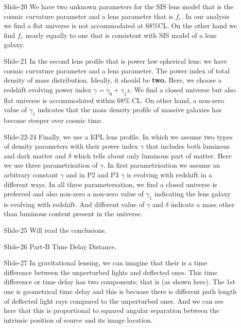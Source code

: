 \documentclass[12pt]{report}
\begin{document}
\begin{itemize}
\item[\ding{74} Slide-20]
We have two unknown parameters for the SIS lens model that is the cosmic curvature parameter and a lens parameter that is $f_e$. In our analysis we find a flat universe is not accommodated at $68\%$CL. On the other hand we find $f_e$ nearly equally to one that is consistent with SIS model of a lens galaxy. 

\item[\ding{74} Slide-21]
In the second lens profile that is power law spherical lens: we have cosmic curvature parameter and a lens parameter. The power index of total density of mass distribution. Ideally, it should be \textbf{two.} Here, we choose a redshift evolving power index $\gamma=\gamma_0+\gamma_1z$. We find a closed universe but also flat universe is accommodated within $68\%$ CL. On other hand, a non-zero value of $\gamma_1$ indicates that the mass density profile of massive galaxies has become steeper over cosmic time.

\item[\ding{74} {\footnotesize Slide-22-24}]
Finally, we use a EPL lens profile. In which we assume two types of density parameters with their power index $\gamma$ that includes both luminous and dark matter and $\delta$ which tells about only luminous part of matter. Here we use three parametrisation of $\gamma$. In first parametrisation we assume an arbitrary constant $\gamma$ and in P2 and P3 $\gamma$ is evolving with redshift in a different ways. In all three parametersation, we find a closed universe is preferred and also non-zero a non-zero value of $\gamma_1$ indicating the lens galaxy is evolving with redshift. And different value of $\gamma$ and $\delta$ indicate a mass other than luminous content present in the universe.

\item[\ding{74} Slide-25] 
Will read the conclusions.

\item[\ding{74} Slide-26]
\hspace{5cm}  Part-B Time Delay Distance.

\item[\ding{74} Slide-27]
In gravitational lensing, we can imagine that their is a time difference between the unperturbed lights and deflected ones. This time difference or time delay has two components; that is (as shown here). The 1st one is geometrical time delay and this is becuase there is different path length of deflected light rays compared to the unperturbed ones. And we can see here that this is proportional to squared angular separation between the intrinsic position of source and its image location. 


\end{itemize}
\end{document}

